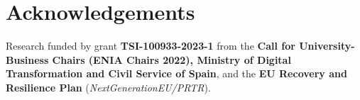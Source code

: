 \section*{Acknowledgements} %

Research funded by grant \textbf{TSI-100933-2023-1} from the \textbf{Call for University-Business Chairs (ENIA Chairs 2022), Ministry of Digital Transformation and Civil Service of Spain}, and the \textbf{EU Recovery and Resilience Plan} (\textit{NextGenerationEU/PRTR}).
